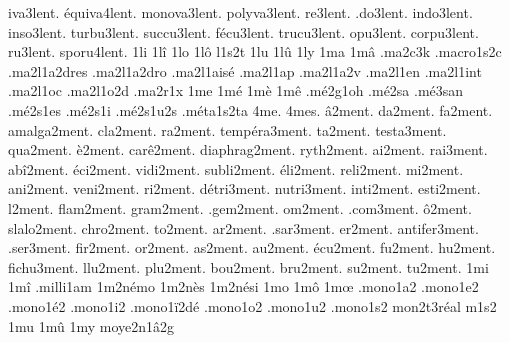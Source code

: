 {   iva3lent.
équiva4lent.
monova3lent.
polyva3lent.
    re3lent.
   .do3lent.
  indo3lent.
  inso3lent.
 turbu3lent.
 succu3lent.
  fécu3lent.
 trucu3lent.
   opu3lent.
 corpu3lent.
    ru3lent.
 sporu4lent.
%
1li
1lî
1lo
1lô
l1s2t
1lu
1lû
1ly
1ma
1mâ
                    .ma2c3k
                    .macro1s2c
                    .ma2l1a2dres
                    .ma2l1a2dro
                    .ma2l1aisé
                    .ma2l1ap
                    .ma2l1a2v
                    .ma2l1en
                    .ma2l1int
                    .ma2l1oc
                    .ma2l1o2d
                    .ma2r1x %
1me
1mé
1mè
1mê
                    .mé2g1oh
                    .mé2sa %
                    .mé3san %
                    .mé2s1es
                    .mé2s1i
                    .mé2s1u2s
                    .méta1s2ta
4me.
4mes.
       â2ment.
       da2ment.
       fa2ment.
   amalga2ment.
      cla2ment.
       ra2ment.
  tempéra3ment.
       ta2ment.
    testa3ment.
      qua2ment.
        è2ment.
     carê2ment.
 diaphrag2ment.
     ryth2ment.
       ai2ment.
      rai3ment.
      abî2ment.
      éci2ment.
     vidi2ment.
    subli2ment.
      éli2ment.
     reli2ment.
       mi2ment.
      ani2ment.
     veni2ment.
       ri2ment.
    détri3ment.
    nutri3ment.
     inti2ment.
     esti2ment.
        l2ment.
     flam2ment.
     gram2ment.
     .gem2ment.
       om2ment.
     .com3ment.
        ô2ment.
    slalo2ment.
     chro2ment.
       to2ment.
       ar2ment.
     .sar3ment.
       er2ment.
  antifer3ment.
     .ser3ment.
      fir2ment.
       or2ment.
       as2ment.
       au2ment.
      écu2ment.
       fu2ment.
       hu2ment.
    fichu3ment.
      llu2ment.
      plu2ment.
      bou2ment.
      bru2ment.
       su2ment.
       tu2ment.
%
1mi
1mî
                    .milli1am
                    1m2némo
                    1m2nès
                    1m2nési
1mo
1mô
1mœ
                    .mono1a2
                    .mono1e2
                    .mono1é2
                    .mono1i2
                    .mono1ï2dé
                    .mono1o2
                    .mono1u2
                    .mono1s2
                    mon2t3réal %
m1s2
1mu
1mû
1my
                    moye2n1â2g
}
